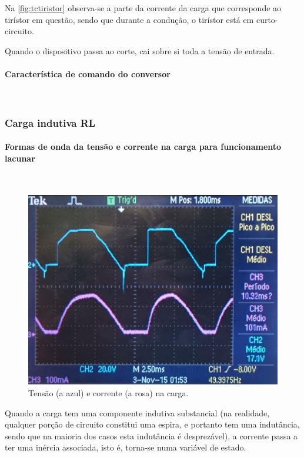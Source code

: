 \documentclass[a4paper,11pt]{article}
\numberwithin{equation}{section}
\begin{document}
Na \autoref{fig:tctiristor} observa-se a parte da corrente da carga que corresponde ao tirístor em questão, sendo que durante a condução, o tirístor está em curto-circuito.

Quando o dispositivo passa ao corte, cai sobre si toda a tensão de entrada.

\paragraph{Característica de comando do conversor} \mbox{}\

\subsubsection{Carga indutiva RL}

\paragraph{Formas de onda da tensão e corrente na carga para funcionamento lacunar} \mbox{}\

\begin{figure}[H]
	\centering
	\includegraphics[keepaspectratio=true, scale=0.15]{img/DSC_0184}
	\caption{Tensão (a azul) e corrente (a rosa) na carga.}
	\label{fig:tcentradalacuna}
	\vspace{-0.8em}
\end{figure}

Quando a carga tem uma componente indutiva substancial (na realidade, qualquer porção de circuito constitui uma espira, e portanto tem uma indutância, sendo que na maioria dos casos esta indutância é desprezável), a corrente passa a ter uma inércia associada, isto é, torna-se numa variável de estado.
\end{document}
